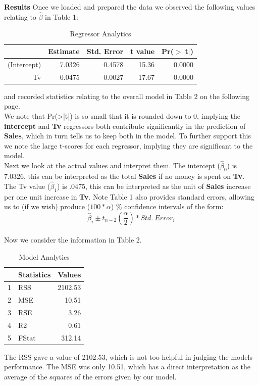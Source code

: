 \documentclass{article}
\begin{document}
\textbf{Results}
Once we loaded and prepared the data we observed the following values relating to $\hat{\beta}$ in Table 1:

\begin{table}[ht]
\centering
\begin{tabular}{rrrrr}
  \hline
 & Estimate & Std. Error & t value & Pr($>$$|$t$|$) \\ 
  \hline
(Intercept) & 7.0326 & 0.4578 & 15.36 & 0.0000 \\ 
  Tv & 0.0475 & 0.0027 & 17.67 & 0.0000 \\ 
   \hline
\end{tabular}
\caption{Regressor Analytics} 
\end{table}and recorded statistics relating to the overall model in Table 2 on the following page.\\
We note that Pr(>|t|) is so small that it is rounded down to 0, implying the \textbf{intercept} and \textbf{Tv} regressors both contribute significantly in the prediction of \textbf{Sales}, which in turn tells us to keep both in the model. To further support this we note the large t-scores for each regressor, implying they are significant to the model.\\
Next we look at the actual values and interpret them. The intercept ($\hat{\beta}_{0}$) is 7.0326, this can be interpreted as the total \textbf{Sales} if no money is spent on \textbf{Tv}. The Tv value ($\hat{\beta}_{1}$) is .0475, this can be interpreted as the unit of \textbf{Sales} increase per one unit increase in \textbf{Tv}. Note Table 1 also provides standard errors, allowing us to (if we wish) produce ($100 * \alpha$) \% confidence intervals of the form:
$$ \hat{\beta}_{i} \pm t_{n-2}(\dfrac{\alpha}{2})* Std.\ Error_{i} $$\\
Now we consider the information in Table 2.
\begin{table}[ht]
\centering
\begin{tabular}{rlr}
  \hline
 & Statistics & Values \\ 
  \hline
1 & RSS & 2102.53 \\ 
  2 & MSE & 10.51 \\ 
  3 & RSE & 3.26 \\ 
  4 & R2 & 0.61 \\ 
  5 & FStat & 312.14 \\ 
   \hline
\end{tabular}
\caption{Model Analytics} 
\end{table}
The RSS gave a value of 2102.53, which is not too helpful in judging the models performance. The MSE was only 10.51, which has a direct interpretation as the average of the squares of the errors given by our model.\\
\end{document}
